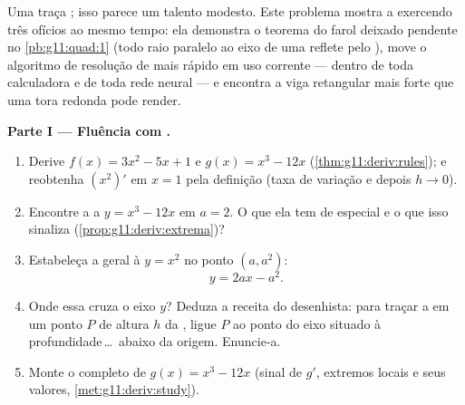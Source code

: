 \begin{problem}
\label{pb:g11:deriv:1}
Uma  traça ; isso parece um talento modesto. Este
problema mostra a  exercendo três ofícios ao mesmo tempo:
ela demonstra o teorema do farol deixado pendente no
\cref{pb:g11:quad:1} (todo raio paralelo ao eixo de uma 
reflete pelo ), move o algoritmo de resolução de  mais
rápido em uso corrente --- dentro de toda calculadora e de toda
rede neural --- e encontra a viga retangular mais forte que uma
tora redonda pode render.

\medskip
\noindent\textbf{Parte I --- Fluência com .}
\begin{enumerate}
  \item Derive $f(x) = 3x^2 - 5x + 1$ e $g(x) = x^3 - 12x$
        (\cref{thm:g11:deriv:rules}); e reobtenha
        $\left(x^2\right)'$ em $x = 1$ pela definição (taxa de
        variação e depois $h \to 0$).
  \item Encontre a  a $y = x^3 - 12x$ em $a = 2$. O que
        ela tem de especial e o que isso sinaliza
        (\cref{prop:g11:deriv:extrema})?
  \item Estabeleça a  geral à  $y = x^2$ no ponto
        $(a, a^2)$:
        \[
        y = 2ax - a^2 .
        \]
  \item Onde essa  cruza o eixo $y$? Deduza a receita do
        desenhista: para traçar a  em um ponto $P$ de
        altura $h$ da , ligue $P$ ao ponto do eixo
        situado à profundidade\,\dots\ abaixo da origem.
        Enuncie-a.
  \item Monte o  completo de
        $g(x) = x^3 - 12x$ (sinal de $g'$, extremos locais e seus
        valores, \cref{met:g11:deriv:study}).
\end{enumerate}


\end{problem}
